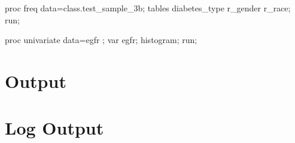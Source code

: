\documentclass{article}\usepackage[]{graphicx}\usepackage[]{color}
\begin{document}
\begin{Sascode}[store=gfr]
proc freq data=class.test_sample_3b;
tables diabetes_type r_gender r_race;
run;

proc univariate data=egfr ;
var egfr;
histogram;
run;
\end{Sascode}

\section{Output}



\clearpage
\section{Log Output}
\end{document}

